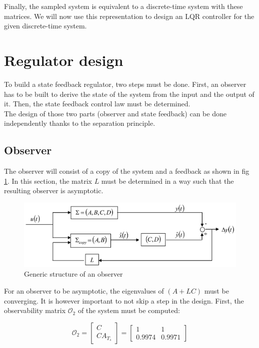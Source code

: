 Finally, the sampled system is equivalent to a discrete-time system with these matrices. We will now use this representation to design an LQR controller for the given discrete-time system.

\section{Regulator design}

To build a state feedback regulator, two steps must be done. First, an observer has to be built to derive the state of 
the system from the input and the output of it. Then, the state feedback control law must be determined.\\
The design of those two parts (observer and state feedback) can be done independently thanks to the separation 
principle.

\subsection{Observer}

The observer will consist of a copy of the system and a feedback as shown in fig \ref{fig:observer structure}. In this
section, the matrix $L$ must be determined in a way such that the resulting observer is asymptotic.

\begin{figure}[H]
    \centering
    \includegraphics[height=\textheight/7]{Pictures/observer_general_structure.png}
    \caption{Generic structure of an observer}
    \label{fig:observer structure}
\end{figure}

For an observer to be asymptotic, the eigenvalues of $(A + LC)$ must be converging. It is however important to not skip
a step in the design. First, the observability matrix $\mathcal{O}_2$ of the system must be computed:

\begin{equation}
    \mathcal{O}_2 = 
    \begin{bmatrix}
        C\\
        C A_{T_s}
    \end{bmatrix}
    =
    \begin{bmatrix}
        1 & 1\\
        0.9974 & 0.9971
    \end{bmatrix}
\end{equation}

